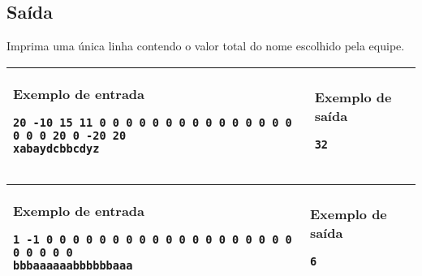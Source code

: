 \subsection*{Saída}

Imprima uma única linha contendo o valor total do nome escolhido pela equipe.

\newpage
\begin{table}[!h]
\centering
\hspace{-2cm}
\begin{tabular}{|l|l|}
\hline
\begin{minipage}[t]{5.5in}
\textbf{Exemplo de entrada}
\begin{verbatim}
20 -10 15 11 0 0 0 0 0 0 0 0 0 0 0 0 0 0 0 0 0 0 20 0 -20 20
xabaydcbbcdyz
\end{verbatim}
\vspace{1mm}
\end{minipage}
&
\begin{minipage}[t]{1.5in}
\textbf{Exemplo de saída}
\begin{verbatim}
32
\end{verbatim}
\vspace{1mm}
\end{minipage} \\
\hline
\end{tabular}
\end{table}

\begin{table}[!h]
\centering
\hspace{-2cm}
\begin{tabular}{|l|l|}
\hline
\begin{minipage}[t]{5.5in}
\textbf{Exemplo de entrada}
\begin{verbatim}
1 -1 0 0 0 0 0 0 0 0 0 0 0 0 0 0 0 0 0 0 0 0 0 0 0 0
bbbaaaaaabbbbbbaaa
\end{verbatim}
\vspace{1mm}
\end{minipage}
&
\begin{minipage}[t]{1.5in}
\textbf{Exemplo de saída}
\begin{verbatim}
6
\end{verbatim}
\vspace{1mm}
\end{minipage} \\
\hline
\end{tabular}
\end{table}

